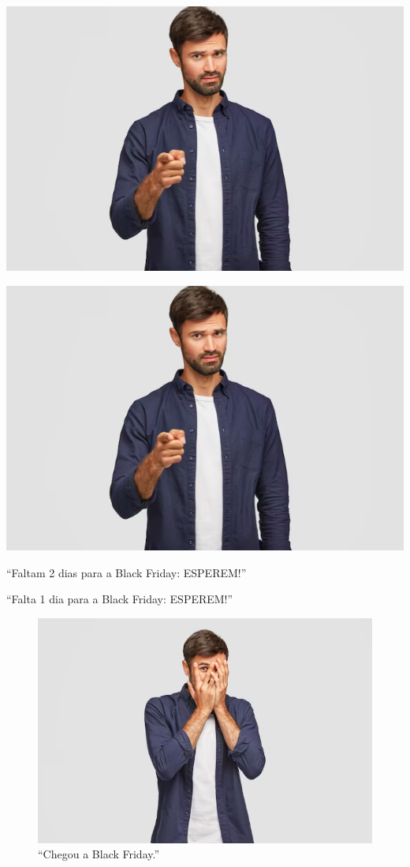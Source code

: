 \begin{minipage}{.5\textwidth}
\includegraphics[width=\textwidth]{./media/img3pt.png}
\end{minipage}
\begin{minipage}{.5\textwidth}
\includegraphics[width=\textwidth]{./media/img3pt.png}
\end{minipage}

``Faltam 2 dias para a Black Friday: ESPEREM!''

``Falta 1 dia para a Black Friday: ESPEREM!''

\begin{figure}[htpb!]
\centering
\includegraphics[width=\textwidth]{./media/img4pt.png}
\caption{``Chegou a Black Friday.''}
\end{figure}


